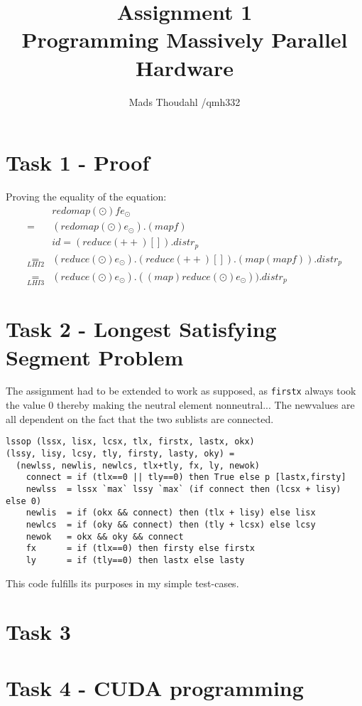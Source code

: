 \documentclass[a4paper,10pt]{article}
\title{Assignment 1  \\Programming Massively Parallel Hardware }
\author{Mads Thoudahl /qmh332}
\begin{document}
\maketitle

\section{Task 1 - Proof}
Proving the equality of the equation:
\begin{align}
  &  redomap (\odot) f e_{\odot} \\
  =& (redomap (\odot) e_{\odot}) . (map f ) \\
   & id = (reduce (++) []) . distr_p \\
  \underset{LHI2}{=}& (reduce (\odot) e_{\odot}) . (reduce (++) []) . ( map (map f )).distr_p \\
  \underset{LHI3}{=}& (reduce (\odot) e_{\odot}) . ((map) reduce (\odot)  e_{\odot})) . distr_{p}
\end{align}

\section{Task 2 - Longest Satisfying Segment Problem }
The assignment had to be extended to work as supposed, as \texttt{firstx} always took the value 0 thereby making the neutral element nonneutral...
The newvalues are all dependent on the fact that the two sublists are connected.
\begin{verbatim}
lssop (lssx, lisx, lcsx, tlx, firstx, lastx, okx)
(lssy, lisy, lcsy, tly, firsty, lasty, oky) =
  (newlss, newlis, newlcs, tlx+tly, fx, ly, newok)
    connect = if (tlx==0 || tly==0) then True else p [lastx,firsty]
    newlss  = lssx `max` lssy `max` (if connect then (lcsx + lisy) else 0)
    newlis  = if (okx && connect) then (tlx + lisy) else lisx
    newlcs  = if (oky && connect) then (tly + lcsx) else lcsy
    newok   = okx && oky && connect
    fx      = if (tlx==0) then firsty else firstx
    ly      = if (tly==0) then lastx else lasty
\end{verbatim}
This code fulfills its purposes in my simple test-cases.


\section{Task 3}



\section{Task 4 - CUDA programming}
\end{document}
